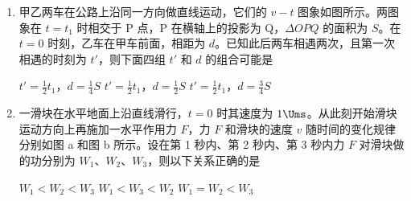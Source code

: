 \documentclass[\gkver]{gaokaozhenti}
\begin{document}
\begin{enumerate}

{流过 $R$ 的电流为由 c 到 d，流过 $r$ 的电流为由 b 到 a}
{流过 $R$ 的电流为由 d 到 c，流过 $r$ 的电流为由 a 到 b}
{流过 $R$ 的电流为由 c 到 d，流过 $r$ 的电流为由 a 到 b}


\item
甲乙两车在公路上沿同一方向做直线运动，它们的 $v-t$ 图象如图所示。两图象在 $t=t_{1}$ 时相交于 P 点，P 在横轴上的投影为 Q，$\Delta OPQ$ 的面积为 $S$。在 $t=0$ 时刻，乙车在甲车前面，相距为 $d$。已知此后两车相遇两次，且第一次相遇的时刻为 $t'$，则下面四组 $t'$ 和 $d$ 的组合可能是


{$t'=\frac{1}{2}t_{1}$，$d=\frac{1}{4}S$}
{$t'=\frac{1}{2}t_{1}$，$d=\frac{1}{2}S$}
{$t'=\frac{1}{2}t_{1}$，$d=\frac{3}{4}S$}


\item
一滑块在水平地面上沿直线滑行，$t=0$ 时其速度为 $1\Ums$。从此刻开始滑块运动方向上再施加一水平作用力 $F$，力 $F$ 和滑块的速度 $v$ 随时间的变化规律分别如图 a 和图 b 所示。设在第 1 秒内、第 2 秒内、第 3 秒内力 $F$ 对滑块做的功分别为 $W_{1}$、$W_{2}$、$W_{3}$，则以下关系正确的是


{$W_{1}<W_{2}<W_{3}$}
{$W_{1}<W_{3}<W_{2}$}
{$W_{1}=W_{2}<W_{3}$}


\end{enumerate}
\end{document}
